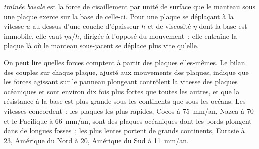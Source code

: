 \begin{omfigure}

\par{}\label{fig:b3:mantle-convection:ridge-push}
\end{omfigure}

\begin{definition}\label{def:b3:mantle-convection:basal-drag}
\emph{traînée basale} est la force de cisaillement par unité de surface que le
manteau sous une plaque exerce sur la base de celle-ci. Pour une plaque se déplaçant à la vitesse $u$
au-dessus d'une couche d'épaisseur $h$ et de viscosité $\eta$ dont la base est immobile, elle vaut
$\eta u/h$, dirigée à l'opposé du mouvement~; elle entraîne la plaque là où le manteau sous-jacent
se déplace plus vite qu'elle.
\end{definition}

On peut lire quelles forces comptent à partir des plaques elles-mêmes. Le bilan des couples
sur chaque plaque, ajusté aux mouvements des plaques, indique que les forces agissant sur le
panneau plongeant contrôlent la vitesse des plaques océaniques et sont environ dix fois
plus fortes que toutes les autres, et que la résistance à la base est plus grande sous
les continents que sous les océans. Les vitesses concordent~: les plaques les plus rapides, Cocos à
\qty{75}{mm/an}, Nazca à 70 et le Pacifique à \qty{66}{mm/an}, sont des plaques océaniques
dont les bords plongent dans de longues fosses~; les plus lentes portent de grands continents,
Eurasie à 23, Amérique du Nord à 20, Amérique du Sud à \qty{11}{mm/an}.

